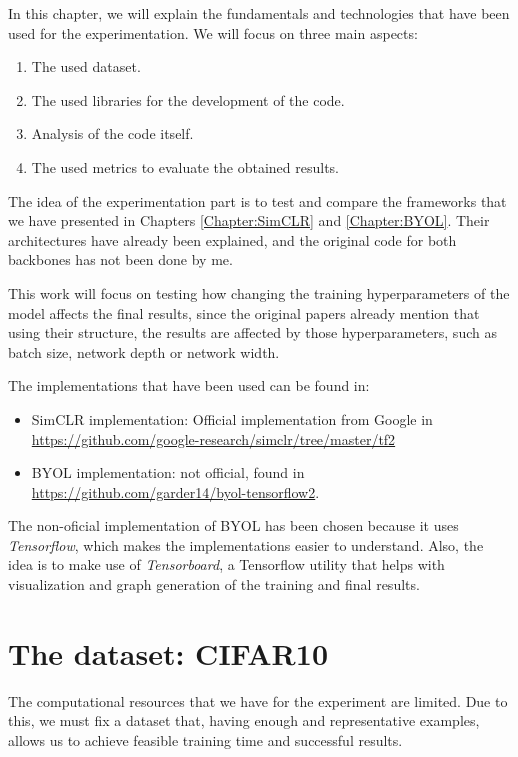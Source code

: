 In this chapter, we will explain the fundamentals and technologies that have been used for the experimentation. We will focus on three main aspects:
\begin{enumerate}
\item The used dataset.
\item The used libraries for the development of the code.
\item Analysis of the code itself.
\item The used metrics to evaluate the obtained results.
\end{enumerate}

The idea of the experimentation part is to test and compare the frameworks that we have presented in Chapters \ref{Chapter:SimCLR} and \ref{Chapter:BYOL}. Their architectures have already been explained, and the original code for both backbones has not been done by me. 

This work will focus on testing how changing the training hyperparameters of the model affects the final results, since the original papers \cite{chen_simple_2020,grill2020bootstrap} already mention that using their structure, the results are affected by those hyperparameters, such as batch size, network depth or network width.

The implementations that have been used can be found in:
\begin{itemize}
\item SimCLR implementation: Official implementation from Google in \url{https://github.com/google-research/simclr/tree/master/tf2}

\item BYOL implementation: not official, found in \url{https://github.com/garder14/byol-tensorflow2}. 
\end{itemize}

The non-oficial implementation of BYOL has been chosen because it uses \emph{Tensorflow}, which makes the implementations easier to understand. Also, the idea is to make use of \emph{Tensorboard}, a Tensorflow utility that helps with visualization and graph generation of the training and final results.


\section{The dataset: CIFAR10}

The computational resources that we have for the experiment are limited. Due to this, we must fix a dataset that, having enough and representative examples, allows us to achieve feasible training time and successful results.

